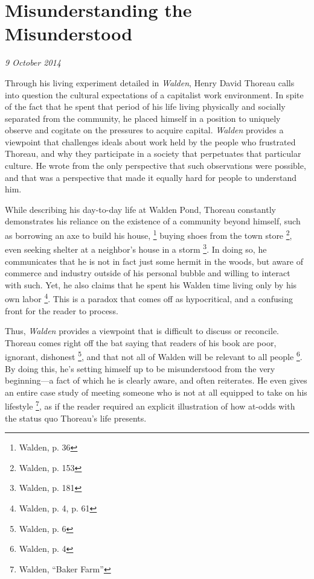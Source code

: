 \section{Misunderstanding the Misunderstood}

\textit{9 October 2014}


Through his living experiment detailed in \textit{Walden}, Henry David
Thoreau calls into question the cultural expectations of a capitalist work
environment. In spite of the fact that he spent that period of his life living
physically and socially separated from the community, he placed himself in a
position to uniquely observe and cogitate on the pressures to acquire capital.
\textit{Walden} provides a viewpoint that challenges ideals about work held by
the people who frustrated Thoreau, and why they participate in a society that
perpetuates that particular culture. He wrote from the only perspective that
such observations were possible, and that was a perspective that made it equally
hard for people to understand him.

While describing his day-to-day life at Walden Pond, Thoreau constantly
demonstrates his reliance on the existence of a community beyond himself, such
as borrowing an axe to build his house,
\footnote{Walden, p. 36} buying shoes from the town store \footnote{Walden, p.
153}, even seeking shelter at a neighbor's house in a storm \footnote{Walden,
p. 181}. In doing so, he communicates that he is not in fact just some hermit
in the woods, but aware of commerce and industry outside of his personal
bubble and willing to interact with such. Yet, he also claims that he
spent his Walden time living only by his own labor \footnote{Walden, p. 4, p.
61}. This is a paradox that comes off as hypocritical, and a confusing front
for the reader to process.

Thus, \textit{Walden} provides a viewpoint that is difficult to discuss
or reconcile. Thoreau comes right off the bat saying that readers of his
book are poor, ignorant, dishonest \footnote{Walden, p. 6}, and that not all of Walden will be
relevant to all people \footnote{Walden, p. 4}. By doing this, he's setting himself up to be
misunderstood from the very beginning---a fact of which he is clearly aware,
and often reiterates.  He even gives an entire case study of meeting someone
who is not at all equipped to take on his lifestyle \footnote{Walden, ``Baker
Farm''}, as if the reader required an explicit illustration of how at-odds
with the status quo Thoreau's life presents. 

